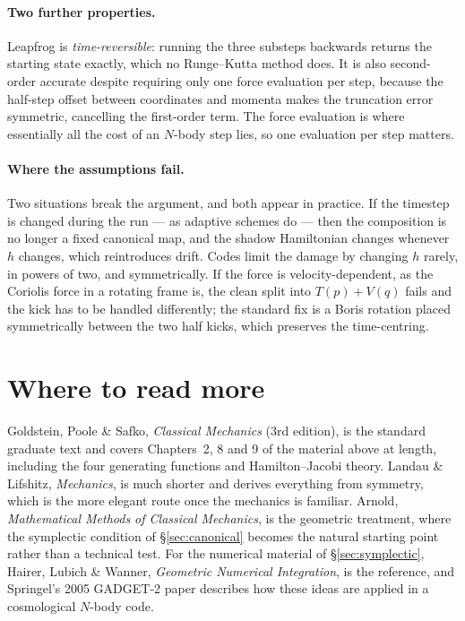\documentclass[12pt]{article}
\begin{document}
\paragraph{Two further properties.}  Leapfrog is
\emph{time-reversible}: running the three substeps backwards returns
the starting state exactly, which no Runge--Kutta method does.  It is
also second-order accurate despite requiring only one force evaluation
per step, because the half-step offset between coordinates and momenta
makes the truncation error symmetric, cancelling the first-order term.
The force evaluation is where essentially all the cost of an $N$-body
step lies, so one evaluation per step matters.

\paragraph{Where the assumptions fail.}  Two situations break the
argument, and both appear in practice.  If the timestep is changed
during the run --- as adaptive schemes do --- then the composition is
no longer a fixed canonical map, and the shadow Hamiltonian changes
whenever $h$ changes, which reintroduces drift.  Codes limit the damage
by changing $h$ rarely, in powers of two, and symmetrically.  If the
force is velocity-dependent, as the Coriolis force in a rotating frame
is, the clean split into $T(p) + V(q)$ fails and the kick has to be
handled differently; the standard fix is a Boris rotation placed
symmetrically between the two half kicks, which preserves the
time-centring.

\section{Where to read more}
\label{sec:reading}

Goldstein, Poole \& Safko, \emph{Classical Mechanics} (3rd edition), is
the standard graduate text and covers Chapters~2, 8 and 9 of the
material above at length, including the four generating functions and
Hamilton--Jacobi theory.  Landau \& Lifshitz, \emph{Mechanics}, is much
shorter and derives everything from symmetry, which is the more elegant
route once the mechanics is familiar.  Arnold, \emph{Mathematical
Methods of Classical Mechanics}, is the geometric treatment, where the
symplectic condition of \S\ref{sec:canonical} becomes the natural
starting point rather than a technical test.  For the numerical
material of \S\ref{sec:symplectic}, Hairer, Lubich \& Wanner,
\emph{Geometric Numerical Integration}, is the reference, and
Springel's 2005 GADGET-2 paper describes how these ideas are applied in
a cosmological $N$-body code.
\end{document}
